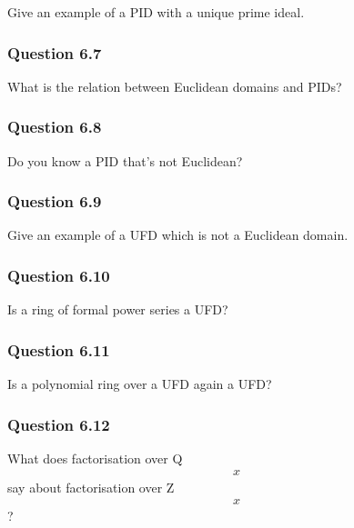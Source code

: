 Give an example of a PID with a unique prime ideal.

\hypertarget{question-6.7}{%
\subsubsection{Question 6.7}\label{question-6.7}}

What is the relation between Euclidean domains and PIDs?

\hypertarget{question-6.8}{%
\subsubsection{Question 6.8}\label{question-6.8}}

Do you know a PID that's not Euclidean?

\hypertarget{question-6.9}{%
\subsubsection{Question 6.9}\label{question-6.9}}

Give an example of a UFD which is not a Euclidean domain.

\hypertarget{question-6.10}{%
\subsubsection{Question 6.10}\label{question-6.10}}

Is a ring of formal power series a UFD?

\hypertarget{question-6.11}{%
\subsubsection{Question 6.11}\label{question-6.11}}

Is a polynomial ring over a UFD again a UFD?


\hypertarget{question-6.12}{%
\subsubsection{Question 6.12}\label{question-6.12}}

What does factorisation over Q
\begin{align*}x\end{align*}
say about factorisation over Z
\begin{align*}x\end{align*}
?

